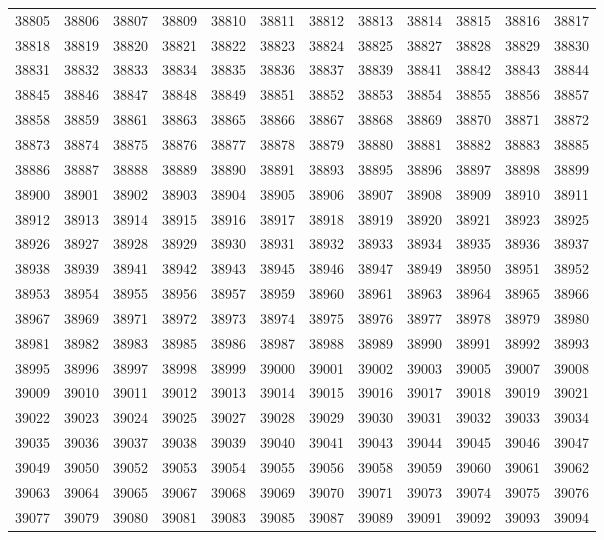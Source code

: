 \begin{center}
\begin{longtable}{llllllllllll}
38805 &38806 &38807 &38809 &38810 &38811 &38812 &38813 &38814 &38815 &38816 &38817 \\
38818 &38819 &38820 &38821 &38822 &38823 &38824 &38825 &38827 &38828 &38829 &38830 \\
38831 &38832 &38833 &38834 &38835 &38836 &38837 &38839 &38841 &38842 &38843 &38844 \\
38845 &38846 &38847 &38848 &38849 &38851 &38852 &38853 &38854 &38855 &38856 &38857 \\
38858 &38859 &38861 &38863 &38865 &38866 &38867 &38868 &38869 &38870 &38871 &38872 \\
38873 &38874 &38875 &38876 &38877 &38878 &38879 &38880 &38881 &38882 &38883 &38885 \\
38886 &38887 &38888 &38889 &38890 &38891 &38893 &38895 &38896 &38897 &38898 &38899 \\
38900 &38901 &38902 &38903 &38904 &38905 &38906 &38907 &38908 &38909 &38910 &38911 \\
38912 &38913 &38914 &38915 &38916 &38917 &38918 &38919 &38920 &38921 &38923 &38925 \\
38926 &38927 &38928 &38929 &38930 &38931 &38932 &38933 &38934 &38935 &38936 &38937 \\
38938 &38939 &38941 &38942 &38943 &38945 &38946 &38947 &38949 &38950 &38951 &38952 \\
38953 &38954 &38955 &38956 &38957 &38959 &38960 &38961 &38963 &38964 &38965 &38966 \\
38967 &38969 &38971 &38972 &38973 &38974 &38975 &38976 &38977 &38978 &38979 &38980 \\
38981 &38982 &38983 &38985 &38986 &38987 &38988 &38989 &38990 &38991 &38992 &38993 \\
38995 &38996 &38997 &38998 &38999 &39000 &39001 &39002 &39003 &39005 &39007 &39008 \\
39009 &39010 &39011 &39012 &39013 &39014 &39015 &39016 &39017 &39018 &39019 &39021 \\
39022 &39023 &39024 &39025 &39027 &39028 &39029 &39030 &39031 &39032 &39033 &39034 \\
39035 &39036 &39037 &39038 &39039 &39040 &39041 &39043 &39044 &39045 &39046 &39047 \\
39049 &39050 &39052 &39053 &39054 &39055 &39056 &39058 &39059 &39060 &39061 &39062 \\
39063 &39064 &39065 &39067 &39068 &39069 &39070 &39071 &39073 &39074 &39075 &39076 \\
39077 &39079 &39080 &39081 &39083 &39085 &39087 &39089 &39091 &39092 &39093 &39094 \\

\end{longtable}
\end{center}
